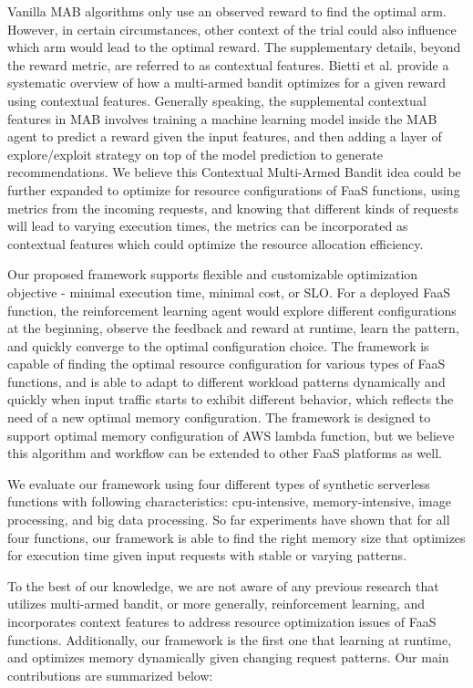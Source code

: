 \documentclass[conference]{IEEEtran}
\begin{document}
Vanilla MAB algorithms only use an observed reward to find the optimal arm. However, in certain circumstances, other context of the trial could also influence which arm would lead to the optimal reward. The supplementary details, beyond the reward metric, are referred to as contextual features. Bietti et al. \cite{10.5555/3546258.3546391} provide a systematic overview of how a multi-armed bandit optimizes for a given reward using contextual features. Generally speaking, the supplemental contextual features in MAB involves training a machine learning model inside the MAB agent to predict a reward given the input features, and then adding a layer of explore/exploit strategy on top of the model prediction to generate recommendations. We believe this Contextual Multi-Armed Bandit idea could be further expanded to optimize for resource configurations of FaaS functions, using metrics from the incoming requests, and knowing that different kinds of requests will lead to varying execution times, the metrics can be incorporated as contextual features which could optimize the resource allocation efficiency.

Our proposed framework supports flexible and customizable optimization objective - minimal execution time, minimal cost, or SLO. For a deployed FaaS function, the reinforcement learning agent would explore different configurations at the beginning, observe the feedback and reward at runtime, learn the pattern, and quickly converge to the optimal configuration choice. The framework is capable of finding the optimal resource configuration for various types of FaaS functions, and is able to adapt to different workload patterns dynamically and quickly when input traffic starts to exhibit different behavior, which reflects the need of a new optimal memory configuration. The framework is designed to support optimal memory configuration of AWS lambda function, but we believe this algorithm and workflow can be extended to other FaaS platforms as well.

We evaluate our framework using four different types of synthetic serverless functions with following characteristics: cpu-intensive, memory-intensive, image processing, and big data processing. So far experiments have shown that for all four functions, our framework is able to find the right memory size that optimizes for execution time given input requests with stable or varying patterns.

To the best of our knowledge, we are not aware of any previous research that utilizes multi-armed bandit, or more generally, reinforcement learning, and incorporates context features to address resource optimization issues of FaaS functions. Additionally, our framework is the first one that learning at runtime, and optimizes memory dynamically given changing request patterns. Our main contributions are summarized below:
\end{document}
